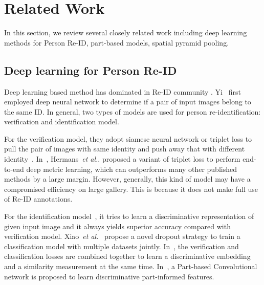\documentclass[letterpaper]{article} \usepackage{aaai19}  \usepackage{times}  \usepackage{helvet}  \usepackage{courier}  \usepackage{url}  \usepackage{graphicx}  \frenchspacing  \setlength{\pdfpagewidth}{8.5in}  \setlength{\pdfpageheight}{11in}  \usepackage{multirow}
\newcommand{\etal}{\emph{et al.}}
\begin{document}
 \section{Related Work}
In this section, we review several closely related work including deep learning methods for Person Re-ID, part-based models, spatial pyramid pooling.

\subsection{Deep learning for Person Re-ID}
Deep learning based method has dominated in Re-ID community \cite{zheng2016person}. Yi~\cite{yi2014deep} first employed deep neural network to determine if a pair of input images belong to the same ID. In general, two types of models are used for person re-identification: verification and identification model. 

For the verification model, they adopt siamese neural network or triplet loss to pull the pair of images with same identity and push away that with different identity~\cite{ahmed2015improved,hermans2017defense,ding2015deep,chen2017multi,li2014deepreid}. In~\cite{hermans2017defense}, Hermans~\etal. proposed a variant of triplet loss to perform end-to-end deep metric learning, which can outperforms many other published methods by a large margin. However, generally, this kind of model may have a compromised efficiency on large gallery. This is because it does not make full use of Re-ID annotations. 


For the identification model~\cite{xiao2016learning,zheng2017discriminatively,sun2017beyond}, it tries to learn a discriminative representation of given input image and it always yields superior accuracy compared with verification model. Xiao~\etal~\cite{xiao2016learning} propose a novel dropout strategy to train a classification model with multiple datasets jointly. In~\cite{zheng2017discriminatively}, the verification and classification losses are combined together to learn a discriminative embedding and a similarity measurement at the same time. In~\cite{sun2017beyond}, a Part-based Convolutional network is proposed to learn discriminative part-informed features.
\end{document}
